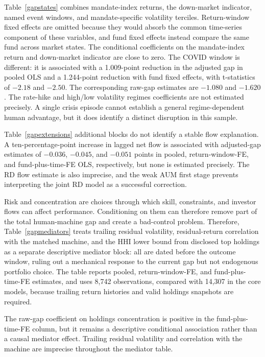 \documentclass[preprint,12pt,authoryear]{elsarticle}
\begin{document}
Table~\ref{gapstates} combines mandate-index returns, the down-market indicator, named event windows, and mandate-specific volatility terciles. Return-window fixed effects are omitted because they would absorb the common time-series component of these variables, and fund fixed effects instead compare the same fund across market states. The conditional coefficients on the mandate-index return and down-market indicator are close to zero. The COVID window is different: it is associated with a 1.009-point reduction in the adjusted gap in pooled OLS and a 1.244-point reduction with fund fixed effects, with t-statistics of $-2.18$ and $-2.50$. The corresponding raw-gap estimates are $-1.080$ and $-1.620$. The rate-hike and high/low volatility regimes coefficients are not estimated precisely. A single crisis episode cannot establish a general regime-dependent human advantage, but it does identify a distinct disruption in this sample.

Table~\ref{gapextensions} additional blocks do not identify a stable flow explanation. A ten-percentage-point increase in lagged net flow is associated with adjusted-gap estimates of $-0.036$, $-0.045$, and $-0.051$ points in pooled, return-window-FE, and fund-plus-time-FE OLS, respectively, but none is estimated precisely. The RD flow estimate is also imprecise, and the weak AUM first stage prevents interpreting the joint RD model as a successful correction.

Risk and concentration are choices through which skill, constraints, and investor flows can affect performance. Conditioning on them can therefore remove part of the total human-machine gap and create a bad-control problem. Therefore, Table~\ref{gapmediators} treats trailing residual volatility, residual-return correlation with the matched machine, and the HHI lower bound from disclosed top holdings as a separate descriptive mediator block: all are dated before the outcome window, ruling out a mechanical response to the current gap but not endogenous portfolio choice. The table reports pooled, return-window-FE, and fund-plus-time-FE estimates, and uses 8,742 observations, compared with 14,307 in the core models, because trailing return histories and valid holdings snapshots are required.

The raw-gap coefficient on holdings concentration is positive in the fund-plus-time-FE column, but it remains a descriptive conditional association rather than a causal mediator effect. Trailing residual volatility and correlation with the machine are imprecise throughout the mediator table. 
\end{document}
